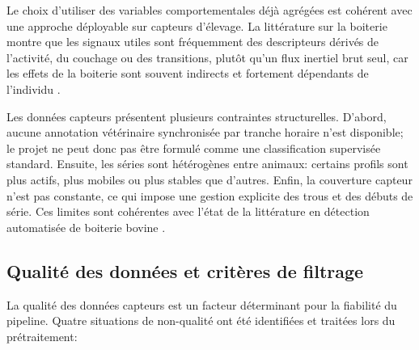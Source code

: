 Le choix d'utiliser des variables comportementales déjà agrégées est cohérent avec une
approche déployable sur capteurs d'élevage. La littérature sur la boiterie montre que les
signaux utiles sont fréquemment des descripteurs dérivés de l'activité, du couchage ou des
transitions, plutôt qu'un flux inertiel brut seul, car les effets de la boiterie sont souvent
indirects et fortement dépendants de l'individu
\citep{oleary2020accelerometers,alsaaod2012electronic,lavrova2023lameness}.

Les données capteurs présentent plusieurs contraintes structurelles. D'abord, aucune annotation
vétérinaire synchronisée par tranche horaire n'est disponible; le projet ne peut donc pas
être formulé comme une classification supervisée standard.
Ensuite, les séries sont hétérogènes entre animaux: certains profils sont plus actifs, plus
mobiles ou plus stables que d'autres. Enfin, la couverture capteur n'est pas constante, ce qui
impose une gestion explicite des trous et des débuts de série. Ces limites sont cohérentes
avec l'état de la littérature en détection automatisée de boiterie bovine
\citep{qiao2021review,merck_hoof_origin_lameness_cattle}.

\subsection{Qualité des données et critères de filtrage}

La qualité des données capteurs est un facteur déterminant pour la fiabilité du pipeline.
Quatre situations de non-qualité ont été identifiées et traitées lors du prétraitement:

